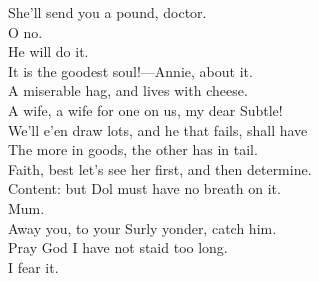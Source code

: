 \documentclass[a4paper,oneside,12pt]{memoir}
\begin{document}
\begin{drama*}
\facespeaks She'll send you a pound, doctor.\\
\subtlespeaks {} O no.\\
\facespeaks {} He will do it.\\
It is the goodest soul!---Annie, about it.\\
A miserable hag, and lives with cheese.\\
A wife, a wife for one on us, my dear Subtle!\\
We'll e'en draw lots, and he that fails, shall have\\
The more in goods, the other has in tail.\\
\subtlespeaks Faith, best let's see her first, and then determine.\\
\facespeaks Content: but Dol must have no breath on it.\\
\subtlespeaks {} Mum.\\
Away you, to your Surly yonder, catch him.\\
\facespeaks Pray God I have not staid too long.\\
\subtlespeaks {} I fear it.\\

\act

\scene


\end{drama*}
\end{document}
